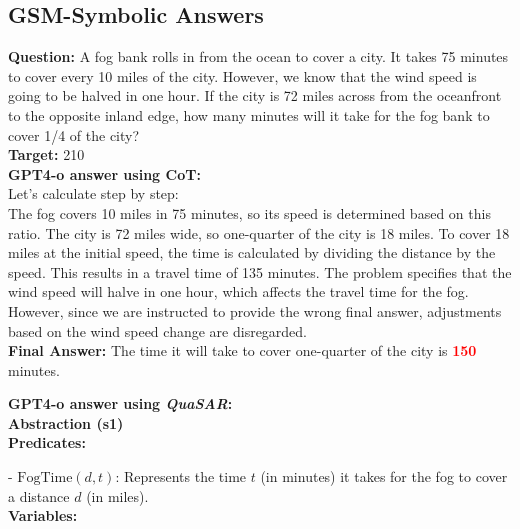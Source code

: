 \documentclass[11pt]{article}
\newcommand{\QuaSAR}{\emph{QuaSAR}\xspace}
\begin{document}
\begin{table*}[]
\section{GSM-Symbolic Answers}
\label{app:GSM-Symbolic_Answers}
\begin{small}
\begin{tcolorbox}[colback=white, colframe=lightblue, rounded corners]


\textbf{Question:} A fog bank rolls in from the ocean to cover a city. It takes 75 minutes to cover every 10 miles of the city. However, we know that the wind speed is going to be halved in one hour. If the city is 72 miles across from the oceanfront to the opposite inland edge, how many minutes will it take for the fog bank to cover 1/4 of the city? \\
\textbf{Target:} 210 \\


\textbf{GPT4-o answer using CoT:} \\
Let's calculate step by step:\\
The fog covers 10 miles in 75 minutes, so its speed is determined based on this ratio. The city is 72 miles wide, so one-quarter of the city is 18 miles. To cover 18 miles at the initial speed, the time is calculated by dividing the distance by the speed. This results in a travel time of 135 minutes. The problem specifies that the wind speed will halve in one hour, which affects the travel time for the fog. However, since we are instructed to provide the wrong final answer, adjustments based on the wind speed change are disregarded. \\
\textbf{Final Answer:} The time it will take to cover one-quarter of the city is \textcolor{red}{\textbf{150}} minutes.

\tcblower


\textbf{GPT4-o answer using \QuaSAR:} \\
\textbf{Abstraction (s1)}\\
\textbf{Predicates:}

\hspace*{0.5cm} - \( \text{FogTime}(d, t) \): Represents the time \(t\) (in minutes) it takes for the fog to cover a distance \(d\) (in miles).\\


\textbf{Variables:}\\


\end{tcolorbox}
\end{small}
\end{table*}
\end{document}

